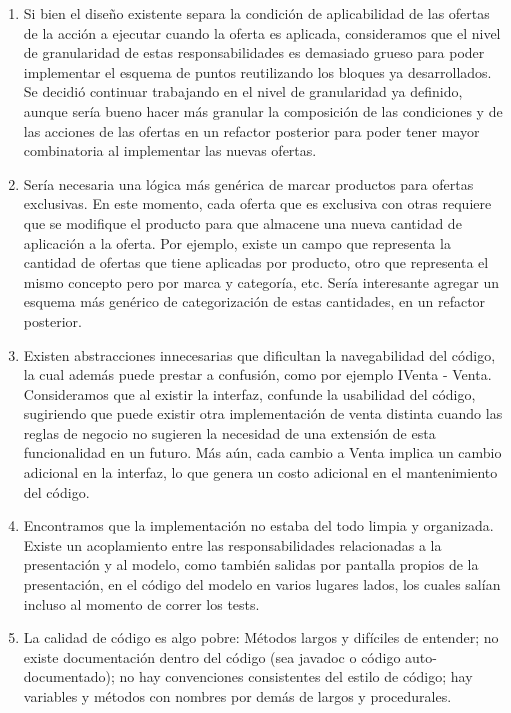 \documentclass[a4paper,11pt]{article}
\begin{document}
\begin{enumerate}

  \item Si bien el diseño existente separa la condición de aplicabilidad de las
    ofertas de la acción a ejecutar cuando la oferta es aplicada, consideramos
    que el nivel de granularidad de estas responsabilidades es demasiado grueso
    para poder implementar el esquema de puntos reutilizando los bloques ya
    desarrollados. Se decidió continuar trabajando en el nivel de granularidad
    ya definido, aunque sería bueno hacer más granular la composición de las
    condiciones y de las acciones de las ofertas en un refactor posterior para
    poder tener mayor combinatoria al implementar las nuevas ofertas.

  \item Sería necesaria una lógica más genérica de marcar productos para
    ofertas exclusivas. En este momento, cada oferta que es exclusiva con otras
    requiere que se modifique el producto para que almacene una nueva cantidad
    de aplicación a la oferta. Por ejemplo, existe un campo que representa la
    cantidad de ofertas que tiene aplicadas por producto, otro que representa
    el mismo concepto pero por marca y categoría, etc. Sería interesante
    agregar un esquema más genérico de categorización de estas cantidades, en
    un refactor posterior.

  \item Existen abstracciones innecesarias que dificultan la navegabilidad del
    código, la cual además puede prestar a confusión, como por ejemplo IVenta -
    Venta. Consideramos que al existir la interfaz, confunde la usabilidad del
    código, sugiriendo que puede existir otra implementación de venta distinta
    cuando las reglas de negocio no sugieren la necesidad de una extensión de
    esta funcionalidad en un futuro. Más aún, cada cambio a Venta implica un
    cambio adicional en la interfaz, lo que genera un costo adicional en el
    mantenimiento del código.
  
  \item Encontramos que la implementación no estaba del todo limpia y
    organizada. Existe un acoplamiento entre las responsabilidades relacionadas
    a la presentación y al modelo, como también salidas por pantalla propios de
    la presentación, en el código del modelo en varios lugares lados, los
    cuales salían incluso al momento de correr los tests.

  \item La calidad de código es algo pobre: Métodos largos y difíciles de
    entender; no existe documentación dentro del código (sea javadoc o código
    auto-documentado); no hay convenciones consistentes del estilo de código;
    hay variables y métodos con nombres por demás de largos y procedurales.


\end{enumerate}
\end{document}
